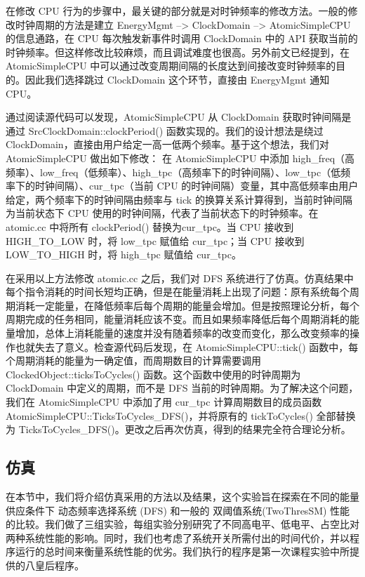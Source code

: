 \documentclass[a4paper,titlepage]{report}
\begin{document}
在修改 CPU 行为的步骤中，最关键的部分就是对时钟频率的修改方法。一般的修改时钟周期的方法是建立 EnergyMgmt --> ClockDomain --> AtomicSimpleCPU 的信息通路，在 CPU 每次触发新事件时调用 ClockDomain 中的 API 获取当前的时钟频率。但这样修改比较麻烦，而且调试难度也很高。另外前文已经提到，在 AtomicSimpleCPU 中可以通过改变周期间隔的长度达到间接改变时钟频率的目的。因此我们选择跳过 ClockDomain 这个环节，直接由 EnergyMgmt 通知 CPU。

通过阅读源代码可以发现，AtomicSimpleCPU 从 ClockDomain 获取时钟间隔是通过 SrcClockDomain::clockPeriod() 函数实现的。我们的设计想法是绕过 ClockDomain，直接由用户给定一高一低两个频率。基于这个想法，我们对 AtomicSimpleCPU 做出如下修改：
在 AtomicSimpleCPU 中添加 high\_freq（高频率）、low\_freq（低频率）、high\_tpc（高频率下的时钟间隔）、low\_tpc（低频率下的时钟间隔）、cur\_tpc（当前 CPU 的时钟间隔）变量，其中高低频率由用户给定，两个频率下的时钟间隔由频率与 tick 的换算关系计算得到，当前时钟间隔为当前状态下 CPU 使用的时钟间隔，代表了当前状态下的时钟频率。在 atomic.cc 中将所有 clockPeriod() 替换为cur\_tpc。当 CPU 接收到 HIGH\_TO\_LOW 时，将 low\_tpc 赋值给 cur\_tpc；当 CPU 接收到 LOW\_TO\_HIGH 时，将 high\_tpc 赋值给 cur\_tpc。

在采用以上方法修改 atomic.cc 之后，我们对 DFS 系统进行了仿真。仿真结果中每个指令消耗的时间长短均正确，但是在能量消耗上出现了问题：原有系统每个周期消耗一定能量，在降低频率后每个周期的能量会增加。但是按照理论分析，每个周期完成的任务相同，能量消耗应该不变。而且如果频率降低后每个周期消耗的能量增加，总体上消耗能量的速度并没有随着频率的改变而变化，那么改变频率的操作也就失去了意义。检查源代码后发现，在 AtomicSimpleCPU::tick() 函数中，每个周期消耗的能量为一确定值，而周期数目的计算需要调用 ClockedObject::ticksToCycles() 函数。这个函数中使用的时钟周期为 ClockDomain 中定义的周期，而不是 DFS 当前的时钟周期。为了解决这个问题，我们在 AtomicSimpleCPU 中添加了用 cur\_tpc 计算周期数目的成员函数 AtomicSimpleCPU::TicksToCycles\_DFS()，并将原有的 tickToCycles() 全部替换为 TicksToCycles\_DFS()。更改之后再次仿真，得到的结果完全符合理论分析。

\subsection{仿真}

在本节中，我们将介绍仿真采用的方法以及结果，这个实验旨在探索在不同的能量供应条件下 动态频率选择系统 (DFS) 和一般的 双阈值系统(TwoThresSM) 性能的比较。我们做了三组实验，每组实验分别研究了不同高电平、低电平、占空比对两种系统性能的影响。同时，我们也考虑了系统开关所需付出的时间代价，并以程序运行的总时间来衡量系统性能的优劣。我们执行的程序是第一次课程实验中所提供的八皇后程序。
\end{document}
